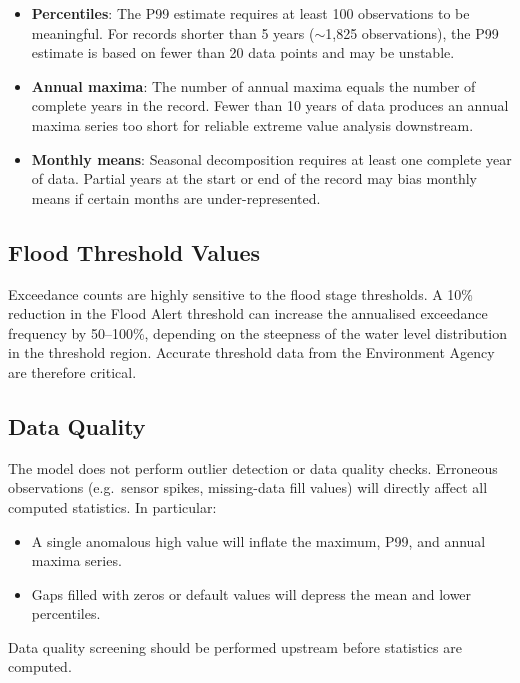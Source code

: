 \documentclass[11pt,a4paper]{article}
\begin{document}
\begin{itemize}
    \item \textbf{Percentiles}: The P99 estimate requires at least 100 observations to be meaningful. For records shorter than 5 years ($\sim$1{,}825 observations), the P99 estimate is based on fewer than 20 data points and may be unstable.
    \item \textbf{Annual maxima}: The number of annual maxima equals the number of complete years in the record. Fewer than 10 years of data produces an annual maxima series too short for reliable extreme value analysis downstream.
    \item \textbf{Monthly means}: Seasonal decomposition requires at least one complete year of data. Partial years at the start or end of the record may bias monthly means if certain months are under-represented.
\end{itemize}

\subsection{Flood Threshold Values}

Exceedance counts are highly sensitive to the flood stage thresholds. A 10\% reduction in the Flood Alert threshold can increase the annualised exceedance frequency by 50--100\%, depending on the steepness of the water level distribution in the threshold region. Accurate threshold data from the Environment Agency are therefore critical.

\subsection{Data Quality}

The model does not perform outlier detection or data quality checks. Erroneous observations (e.g.\ sensor spikes, missing-data fill values) will directly affect all computed statistics. In particular:

\begin{itemize}
    \item A single anomalous high value will inflate the maximum, P99, and annual maxima series.
    \item Gaps filled with zeros or default values will depress the mean and lower percentiles.
\end{itemize}

\noindent Data quality screening should be performed upstream before statistics are computed.
\end{document}
